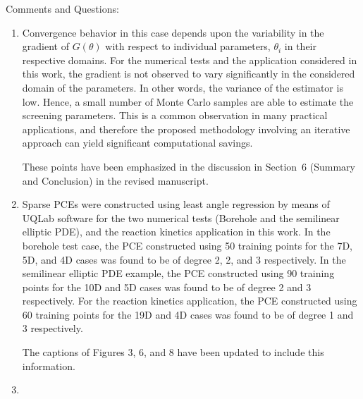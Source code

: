 \documentclass[11pt,final]{article}
\newcommand{\referee}[1]{\vspace{.1ex}\noindent{\textcolor{blue}{#1}}}
\begin{document}
Comments and Questions:
\begin{enumerate}

\item \referee{P16, Figure.2,  the estimated screening parameters eq (5) based on eq(1)
quickly converge with a small number of samples (5-10 samples). It seems that
if $\mu_i$ is based on eq(1), it will still require a reasonable amount of
samples, can authors comment on why this example converges with a small number
of samples? The same question applies to Figure 5 and Figure 7.}

Convergence behavior in this case depends upon the variability in the gradient of
$G(\theta)$ with respect to individual parameters, $\theta_i$ in their respective
domains. For the numerical tests and the application considered in this work, the
gradient is not observed to vary significantly in the considered domain of the
parameters. In other words, the variance of the estimator is low. 
Hence, a small number of Monte Carlo samples are able to estimate
the screening parameters. This is a common observation in many practical
applications, and therefore the proposed methodology involving an iterative
approach can yield significant computational savings. 

These points have been emphasized in the discussion in Section~6 (Summary and
Conclusion) in the revised manuscript. 

\item 
\referee{P17, Figure 3, what's the degree of the PCE used in the example? The same
question applies to Figure 6 and Figure 8.}

Sparse PCEs were constructed using least angle regression by means of UQLab software
for the two numerical tests (Borehole and the semilinear elliptic PDE),
and the reaction kinetics application in this work.  
In the borehole test case, the PCE constructed using 50 training points for the 7D, 5D, and
4D cases was found to be of degree 2, 2, and 3 respectively.  
In the semilinear elliptic PDE example, the PCE constructed using 90 training
points for the 10D and 5D cases was found to be of degree 2 and 3 respectively.
For the reaction kinetics application, the PCE constructed using 60 training points
for the 19D and 4D cases was found to be of degree 1 and 3 respectively. 

The captions of Figures 3, 6, and 8 have been updated to include this information. 

\item
\referee{
P25, Figure 7, it seems that the rank of the parameters and the difference of
$\mu_s$ doesn't change too much over iterations. Does it indicate the initial
parameter screening  (line 1-6 in Algorithm 1) is good enough for ranking the
parameters? Can the authors plot the similar figure for other examples to see
if the iterative screening procedure does make a difference on the ranking the
parameters compared with the initial parameter screening step?}


\end{enumerate}
\end{document}
